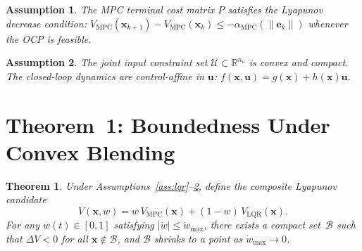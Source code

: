 \documentclass[12pt,a4paper,oneside]{report}
\newtheorem{theorem}{Theorem}[chapter]
\newtheorem{assumption}{Assumption}[chapter]
\begin{document}
\begin{assumption}\label{ass:mpc}
  The MPC terminal cost matrix \(P\) satisfies the Lyapunov decrease
  condition: \(V_{\mathrm{MPC}}(\mathbf{x}_{k+1})-V_{\mathrm{MPC}}(\mathbf{x}_k)
  \leq -\alpha_{\mathrm{MPC}}(\|\mathbf{e}_k\|)\) whenever the OCP is
  feasible.
\end{assumption}

\begin{assumption}\label{ass:convex}
  The joint input constraint set \(\mathcal{U}\subset\mathbb{R}^{n_u}\) is
  convex and compact. The closed-loop dynamics are control-affine in
  \(\mathbf{u}\): \(f(\mathbf{x},\mathbf{u})=g(\mathbf{x})+h(\mathbf{x})\mathbf{u}\).
\end{assumption}

\section{Theorem~1: Boundedness Under Convex Blending}

\begin{theorem}\label{thm:lyapunov}
  Under Assumptions~\ref{ass:lqr}--\ref{ass:convex}, define the composite
  Lyapunov candidate
  \begin{equation}
    V(\mathbf{x},w) = w\,V_{\mathrm{MPC}}(\mathbf{x}) +
                     (1-w)\,V_{\mathrm{LQR}}(\mathbf{x}).
  \end{equation}
  For any \(w(t)\in[0,1]\) satisfying \(|\dot{w}|\leq\dot{w}_{\max}\),
  there exists a compact set~\(\mathcal{B}\) such that
  \(\Delta V < 0\) for all \(\mathbf{x}\notin\mathcal{B}\), and
  \(\mathcal{B}\) shrinks to a point as \(\dot{w}_{\max}\to 0\).
\end{theorem}
\end{document}

